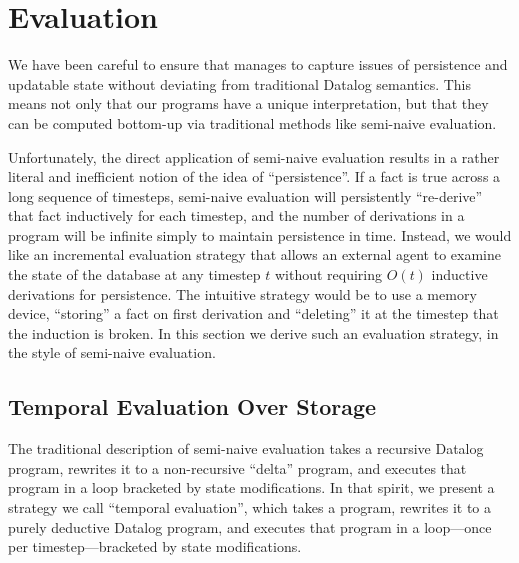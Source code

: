 \section{Evaluation}
We have been careful to ensure that \slang manages to capture issues of persistence and updatable state without deviating from traditional Datalog semantics.  This means not only that our programs have a unique interpretation, but that they can be computed bottom-up via traditional methods like semi-naive evaluation.  

Unfortunately, the direct application of semi-naive evaluation results in a rather literal and inefficient notion of the idea of ``persistence''.  If a fact is true across a long sequence of timesteps, semi-naive evaluation will persistently ``re-derive'' that fact inductively for each timestep, and the number of derivations in a program will be infinite simply to maintain persistence in time.  Instead, we would like an incremental evaluation strategy that allows an external agent to examine the state of the database at any timestep $t$ without requiring $O(t)$ inductive derivations for persistence.  The intuitive strategy would be to use a memory device, ``storing'' a fact on first derivation and ``deleting'' it at the timestep that the induction is broken.  In this section we derive such an evaluation strategy, in the style of semi-naive evaluation.

\subsection{Temporal Evaluation Over Storage}
The traditional description of semi-naive evaluation takes a recursive Datalog program, rewrites it to a non-recursive ``delta'' program, and executes that program in a loop bracketed by state modifications.  In that spirit, we present a strategy we call ``temporal evaluation'', which takes a \slang program, rewrites it to a purely deductive Datalog program, and executes that program in a loop---once per timestep---bracketed by state modifications.  



